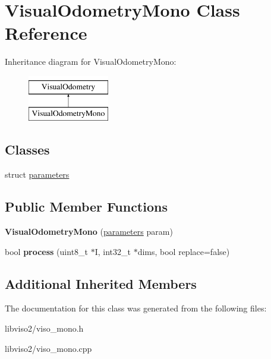 \hypertarget{class_visual_odometry_mono}{\section{Visual\+Odometry\+Mono Class Reference}
\label{class_visual_odometry_mono}
}
Inheritance diagram for Visual\+Odometry\+Mono\+:\begin{figure}[H]
\begin{center}
\leavevmode
\includegraphics[height=2.000000cm]{class_visual_odometry_mono}
\end{center}
\end{figure}
\subsection*{Classes}
\begin{DoxyCompactItemize}
\item 
struct \hyperlink{struct_visual_odometry_mono_1_1parameters}{parameters}
\end{DoxyCompactItemize}
\subsection*{Public Member Functions}
\begin{DoxyCompactItemize}
\item 
\hypertarget{class_visual_odometry_mono_af4d9e82b3e369a8896192068c673e47a}{{\bfseries Visual\+Odometry\+Mono} (\hyperlink{struct_visual_odometry_mono_1_1parameters}{parameters} param)}\label{class_visual_odometry_mono_af4d9e82b3e369a8896192068c673e47a}

\item 
\hypertarget{class_visual_odometry_mono_a450a424f898de00b5441ad0c0931d38c}{bool {\bfseries process} (uint8\+\_\+t $\ast$I, int32\+\_\+t $\ast$dims, bool replace=false)}\label{class_visual_odometry_mono_a450a424f898de00b5441ad0c0931d38c}

\end{DoxyCompactItemize}
\subsection*{Additional Inherited Members}


The documentation for this class was generated from the following files\+:\begin{DoxyCompactItemize}
\item 
libviso2/viso\+\_\+mono.\+h\item 
libviso2/viso\+\_\+mono.\+cpp\end{DoxyCompactItemize}
